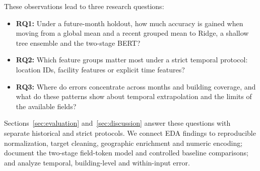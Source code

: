 These observations lead to three research questions:
\begin{itemize}
    \item \textbf{RQ1:} Under a future-month holdout, how much accuracy is gained when moving from a global mean and a recent grouped mean to Ridge, a shallow tree ensemble and the two-stage BERT?
    \item \textbf{RQ2:} Which feature groups matter most under a strict temporal protocol: location IDs, facility features or explicit time features?
    \item \textbf{RQ3:} Where do errors concentrate across months and building coverage, and what do these patterns show about temporal extrapolation and the limits of the available fields?
\end{itemize}
Sections~\ref{sec:evaluation} and~\ref{sec:discussion} answer these questions with separate historical and strict protocols.  We connect EDA findings to reproducible normalization, target cleaning, geographic enrichment and numeric encoding; document the two-stage field-token model and controlled baseline comparisons; and analyze temporal, building-level and within-input error.
